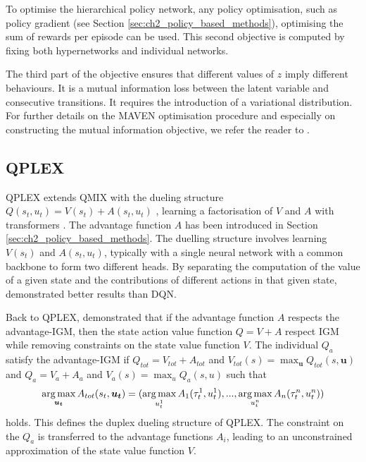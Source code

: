 To optimise the hierarchical policy network, any policy optimisation, such as policy gradient (see Section \ref{sec:ch2_policy_based_methods}), optimising the sum of rewards per episode can be used.
This second objective is computed by fixing both hypernetworks and individual networks.

The third part of the objective ensures that different values of $z$ imply different behaviours. 
It is a mutual information loss between the latent variable and consecutive transitions.
It requires the introduction of a variational distribution. 
For further details on the MAVEN optimisation procedure and especially on constructing the mutual information objective, we refer the reader to \cite{Mahajan2019MAVEN:Exploration}.

\subsection{QPLEX}
QPLEX \citep{wang2021qplex} extends QMIX with the dueling structure $Q(s_t, u_t) = V(s_t) + A(s_t, u_t)$ \citep{wang2016dueling}, learning a factorisation of $V$ and $A$ with transformers \citep{vaswani2017attention}.
The advantage function $A$ has been introduced in Section \ref{sec:ch2_policy_based_methods}.
The duelling structure involves learning $V(s_t)$ and $A(s_t, u_t)$, typically with a single neural network with a common backbone to form two different heads.
By separating the computation of the value of a given state and the contributions of different actions in that given state, \citet{wang2016dueling} demonstrated better results than DQN.

Back to QPLEX, \citet{wang2021qplex} demonstrated that if the advantage function $A$ respects the advantage-IGM, then the state action value function $Q = V + A$ respect IGM while removing constraints on the state value function $V$.
The individual $Q_a$ satisfy the advantage-IGM if $Q_{tot}=V_{tot}+A_{tot}$ and $V_{tot}(s)=\max_{\mathbf{u}} Q_{tot}(s, \mathbf{u})$ and $Q_a=V_a+A_a$ and $V_a(s)=\max_{u} Q_a(s, u)$ such that 
\begin{equation}
    \argmax_{\mathbf{u_t}} A_{tot}(s_t, \mathbf{u_t}) =(\argmax_{u_t^{1}} A_{1}(\tau_t^{1}, u_t^{1}),...,\argmax_{u_t^{n}} A_{n}(\tau_t^{n}, u_t^{n}))    \label{eq:ch3_adv_igm}
\end{equation}
holds.
This defines the duplex dueling structure of QPLEX.
The constraint on the $Q_a$ is transferred to the advantage functions $A_i$, leading to an unconstrained approximation of the state value function $V$.

